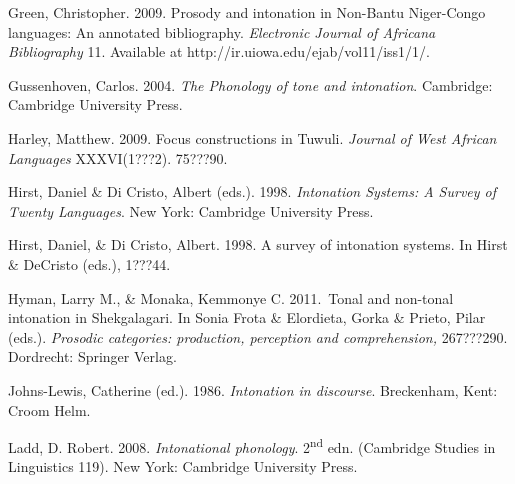 \documentclass[output=paper]{langsci/langscibook}
\begin{document}
\begin{styleBibliographyiv}
Green, Christopher. 2009. Prosody and intonation in Non-Bantu Niger-Congo languages: An annotated bibliography. \emph{Electronic Journal of Africana Bibliography} 11. Available at http://ir.uiowa.edu/ejab/vol11/iss1/1/.
\end{styleBibliographyiv}

\begin{styleBibliographyiv}
Gussenhoven, Carlos. 2004. \emph{The Phonology of tone and intonation}. Cambridge: Cambridge University Press.
\end{styleBibliographyiv}

\begin{styleBibliographyiv}
Harley, Matthew. 2009. Focus constructions in Tuwuli. \emph{Journal of West African Languages} XXXVI(1???2). 75???90.
\end{styleBibliographyiv}

\begin{styleBibliographyiv}
Hirst, Daniel \& Di Cristo, Albert (eds.). 1998. \emph{Intonation Systems: A Survey of Twenty Languages}. New York: Cambridge University Press.
\end{styleBibliographyiv}

\begin{styleBibliographyiv}
Hirst, Daniel, \& Di Cristo, Albert. 1998. A survey of intonation systems. In Hirst \& DeCristo (eds.), 1???44.
\end{styleBibliographyiv}

\begin{styleBibliographyiv}
Hyman, Larry M., \& Monaka, Kemmonye C. 2011.~Tonal and non-tonal intonation in Shekgalagari. In Sonia Frota \& Elordieta, Gorka \& Prieto, Pilar (eds.). \emph{Prosodic categories: production, perception and comprehension,} 267???290. Dordrecht: Springer Verlag.
\end{styleBibliographyiv}

\begin{styleBibliographyiv}
Johns-Lewis, Catherine (ed.). 1986. \emph{Intonation in discourse}. Breckenham, Kent: Croom Helm.
\end{styleBibliographyiv}

\begin{styleBibliographyiv}
Ladd, D. Robert. 2008. \emph{Intonational phonology}. 2\textsuperscript{nd} edn. (Cambridge Studies in Linguistics 119). New York: Cambridge University Press.
\end{styleBibliographyiv}
\end{document}
